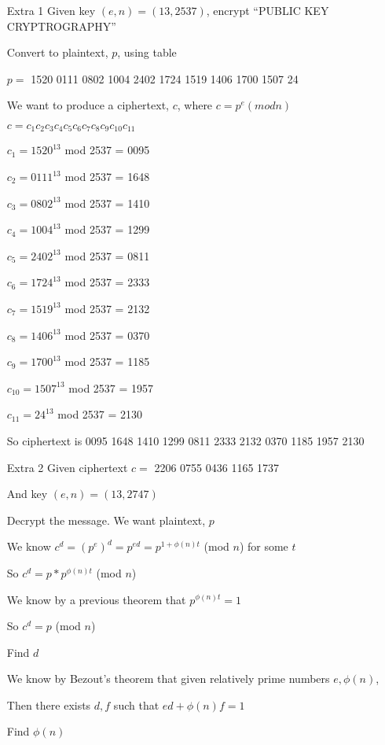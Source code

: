 \documentclass[12pt]{article}
\begin{document}
\begin{itemize}

\item[Extra 1]
  Given key $(e,n) = (13, 2537)$, encrypt ``PUBLIC KEY CRYPTROGRAPHY''

  Convert to plaintext, $p$, using table

  $p = $ 1520 0111 0802 1004 2402 1724  1519   1406   1700  1507  24

  We want to produce a ciphertext, $c$, where $c = p^e (mod n)$

  $c = c_1 c_2 c_3 c_4 c_5 c_6 c_7 c_8 c_9 c_{10} c_{11}$

  $c_1 = 1520^{13}$ mod 2537 = 0095

  $c_2 = 0111^{13}$ mod 2537 = 1648
  
  $c_3 = 0802^{13}$ mod 2537 = 1410

  $c_4 = 1004^{13}$ mod 2537 = 1299

  $c_5 = 2402^{13}$ mod 2537 = 0811

  $c_6 = 1724^{13}$ mod 2537 = 2333

  $c_7 = 1519^{13}$ mod 2537 = 2132

  $c_8 = 1406^{13}$ mod 2537 = 0370

  $c_9 = 1700^{13}$ mod 2537 = 1185

  $c_{10} = 1507^{13}$ mod 2537 = 1957

  $c_{11} = 24^{13}$ mod 2537 = 2130

  So ciphertext is 0095 1648 1410 1299 0811 2333 2132 0370 1185 1957 2130
\newpage

\item[Extra 2]
  Given ciphertext $c =$ 2206 0755 0436 1165 1737

  And key $(e,n) = (13, 2747)$

  Decrypt the message. We want plaintext, $p$

  We know $c^d = (p^{e})^{d} = p^{ed} = p^{1 + \phi (n) t}$ (mod $n$) for some $t$

  So $c^d = p * p^{\phi (n) t}$ (mod $n$)

  We know by a previous theorem that $p^{\phi (n) t} = 1$

  So $c^d = p$ (mod $n$) 

  Find $d$

  We know by Bezout's theorem that given relatively prime numbers $e, \phi (n)$,

  Then there exists $d, f$ such that $ed + \phi (n) f = 1$

  Find $\phi (n)$


\end{itemize}
\end{document}
